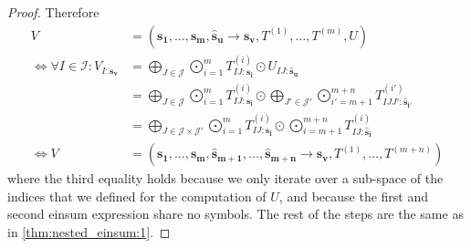 \begin{proof}
    Therefore
    \begin{align*}
        V                                               & = (\bm{s_1},\dots,\bm{s_m}, \bm{\hat{s}_u} \rightarrow \bm{s_v}, T^{(1)},\dots,T^{(m)}, U)                                                                                                                   \\
        \iff \forall I \in \mathcal{I}: V_{I: \bm{s_v}} & = \bigoplus\limits_{J \in \mathcal{J}} \bigodot\limits_{i = 1}^{m} T^{(i)}_{IJ:\bm{s_i}} \odot U_{IJ:\bm{\hat{s}_u}}                                                                                         \\
                                                        & = \bigoplus\limits_{J \in \mathcal{J}} \bigodot\limits_{i = 1}^{m} T^{(i)}_{IJ:\bm{s_i}} \odot \bigoplus\limits_{J' \in \mathcal{J}'} \bigodot\limits_{i' = m + 1}^{m + n} T^{(i')}_{IJJ':\bm{\hat{s}_{i'}}} \\
                                                        & = \bigoplus\limits_{J \in \mathcal{J} \times \mathcal{J}'} \bigodot\limits_{i = 1}^{m} T^{(i)}_{IJ:\bm{s_i}} \odot \bigodot\limits_{i = m + 1}^{m + n} T^{(i)}_{IJ:\bm{\hat{s}_i}}                           \\
        \iff V                                          & = (\bm{s_1}, \dots, \bm{s_m}, \bm{\hat{s}_{m + 1}}, \dots, \bm{\hat{s}_{m + n}} \rightarrow \bm{s_v}, T^{(1)}, \dots, T^{(m + n)})
    \end{align*}
    where the third equality holds because we only iterate over a sub-space of the indices that we defined for the computation of $U$,
    and because the first and second einsum expression share no symbols.
    The rest of the steps are the same as in \autoref{thm:nested_einsum:1}.
\end{proof}